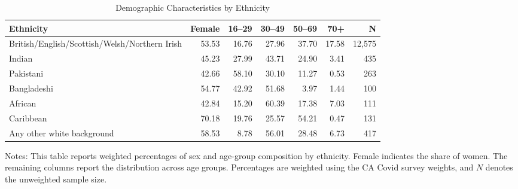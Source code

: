 \begin{table}[htbp]
\centering
\caption{Demographic Characteristics by Ethnicity}
\label{tab:ethnicity_demographic}
\begin{threeparttable}
\footnotesize
\begin{tabular*}{\textwidth}{@{\extracolsep{\fill}}p{5.4cm}rrrrrr}
\toprule
Ethnicity & Female & 16--29 & 30--49 & 50--69 & 70+ & N \\
\midrule
British/English/Scottish/Welsh/Northern Irish & 53.53 & 16.76 & 27.96 & 37.70 & 17.58 & 12,575 \\
Indian & 45.23 & 27.99 & 43.71 & 24.90 & 3.41 & 435 \\
Pakistani & 42.66 & 58.10 & 30.10 & 11.27 & 0.53 & 263 \\
Bangladeshi & 54.77 & 42.92 & 51.68 & 3.97 & 1.44 & 100 \\
African & 42.84 & 15.20 & 60.39 & 17.38 & 7.03 & 111 \\
Caribbean & 70.18 & 19.76 & 25.57 & 54.21 & 0.47 & 131 \\
Any other white background & 58.53 & 8.78 & 56.01 & 28.48 & 6.73 & 417 \\
\bottomrule
\end{tabular*}
\begin{tablenotes}[flushleft]
\footnotesize
\item Notes: This table reports weighted percentages of sex and age-group composition by ethnicity. Female indicates the share of women. The remaining columns report the distribution across age groups. Percentages are weighted using the CA Covid survey weights, and \(N\) denotes the unweighted sample size.
\end{tablenotes}
\end{threeparttable}
\end{table}
